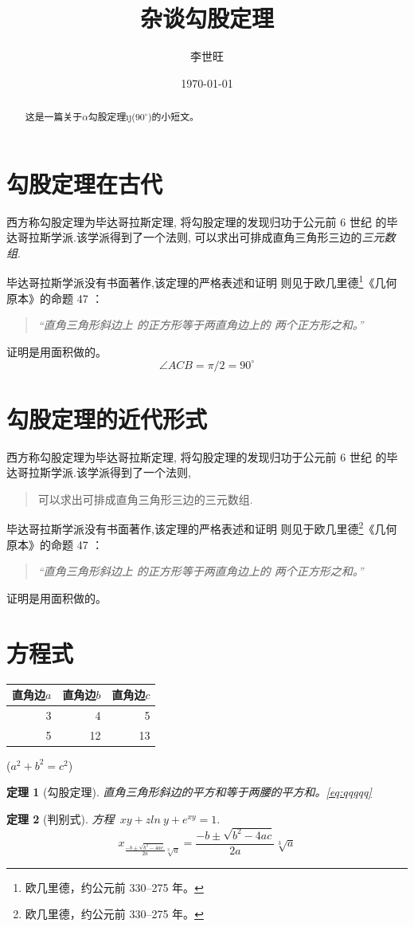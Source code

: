 \documentclass[UTF8]{ctexart}
\title{杂谈勾股定理}
\author{李世旺}
\date{\today}
\newtheorem{thm}{定理}%
\newenvironment{myquote}{\begin{quote}\zihao{-6}\kaishu}{\end{quote}}
\newcommand\degree{^\circ}
\begin{document}
\maketitle
\begin{abstract}
这是一篇关于$\alpha$勾股定理\i\j($90\degree$)的小短文。
\end{abstract}
\tableofcontents
 \section{勾股定理在古代} 
 西方称勾股定理为毕达哥拉斯定理,
 将勾股定理的发现归功于公元前 6 世纪
 的毕达哥拉斯学派.该学派得到了一个法则,
 可以求出可排成直角三角形三边的\emph{三元数组}.
 
 毕达哥拉斯学派没有书面著作,该定理的严格表述和证明
 则见于欧几里德\footnote{欧几里德，约公元前 330--275 年。}《几何原本》的命题 47  ：
 \begin{quote}
 \kaishu
 \emph{ “直角三角形斜边上
 的正方形等于两直角边上的 两个正方形之和。”}
 \end{quote}证明是用面积做的。
 \begin{equation}\label{eq:qqqqq}\angle ACB = \pi / 2 = 90^\circ\end{equation}
 
 
 
 \section{勾股定理的近代形式}
西方称勾股定理为毕达哥拉斯定理,
 将勾股定理的发现归功于公元前 6 世纪
 的毕达哥拉斯学派.该学派得到了一个法则,\begin{quote}可以求出可排成直角三角形三边的三元数组. \end{quote}
 毕达哥拉斯学派没有书面著作,该定理的严格表述和证明
 则见于欧几里德\footnote{欧几里德，约公元前 330--275 年。}《几何原本》的命题 47  ：
 \begin{myquote}
 \emph{ “直角三角形斜边上
 的正方形等于两直角边上的 两个正方形之和。”}
 \end{myquote}证明是用面积做的。
 
 
 
 
 \section{方程式} 
 \begin{table}[H]
 \begin{tabular}{|r|r|r|}
\hline
直角边$a$&直角边$b$&直角边$c$\\
\hline
3&4&5\\
5&12&13\\
\hline
\end{tabular}%
\quad($a^2+b^2=c^2$)
\end{table}
 \begin{thm}[勾股定理]
直角三角形斜边的平方和等于两腰的平方和。\ref{eq:qqqqq}
\end{thm}
 \begin{thm}[判别式]
方程~$xy+zln~y+e^{xy} = 1. $ 
$$x_{\frac{-b \pm \sqrt{b^2 - 4ac}}{2a}\sqrt[3]{a}} = \frac{-b \pm \sqrt{b^2 - 4ac}}{2a}\sqrt[3]{a}$$
\end{thm}
\end{document}
